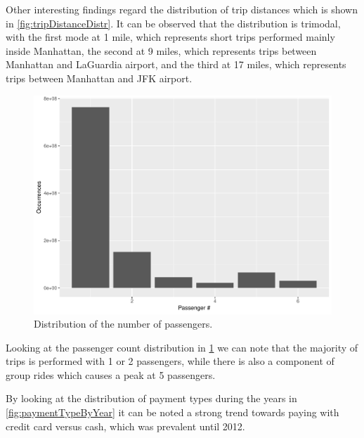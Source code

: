 \documentclass{acm_proc_article-sp-sigmod09}
\begin{document}
Other interesting findings regard the distribution of trip distances which is shown in \cref{fig:tripDistanceDistr}. It can be observed that the distribution is trimodal, with the first mode at 1 mile, which represents short trips performed mainly inside Manhattan, the second at 9 miles, which represents trips between Manhattan and LaGuardia airport, and the third at 17 miles, which represents trips between Manhattan and JFK airport.

\begin{figure}
	\centering
	\includegraphics[width=1\columnwidth]{resources/base_plots/passenger_count_dist.pdf}
	\caption{Distribution of the number of passengers.}
	\label{fig:passengerCountDistr}
\end{figure}

Looking at the passenger count distribution in \cref{fig:passengerCountDistr} we can note that the majority of trips is performed with 1 or 2 passengers, while there is also a component of group rides which causes a peak at 5 passengers.

By looking at the distribution of payment types during the years in \cref{fig:paymentTypeByYear} it can be noted a strong trend towards paying with credit card versus cash, which was prevalent until 2012.
\end{document}
